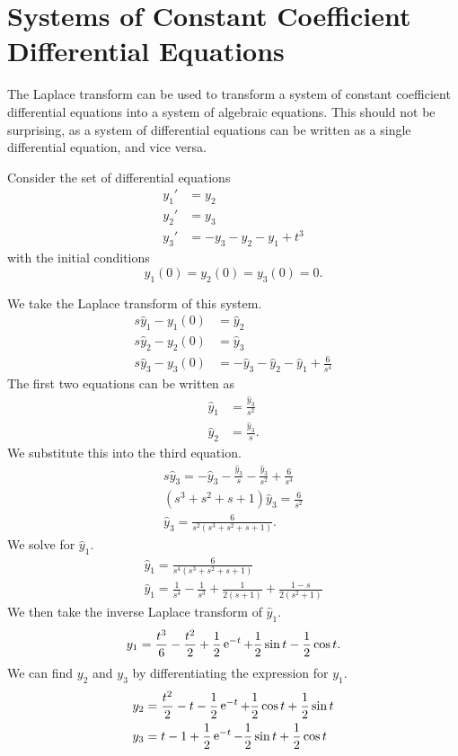 \section{Systems of Constant Coefficient Differential Equations}




The Laplace transform can be used to transform a system of 
constant coefficient differential equations into a system of 
algebraic equations.  This should not be surprising, as a system of
differential equations can be written as a single differential equation,
and vice versa.





\begin{Example}
  Consider the set of differential equations
  \begin{align*}
    y_1' &= y_2 \\
    y_2' &= y_3 \\
    y_3' &= -y_3 - y_2 - y_1 + t^3 
  \end{align*}
  with the initial conditions
  \[ 
  y_1(0) = y_2(0) = y_3(0) = 0.
  \]

  We take the Laplace transform of this system.
  \begin{align*}
    s \hat{y}_1 - y_1(0) &= \hat{y}_2 \\
    s \hat{y}_2 - y_2(0) &= \hat{y}_3 \\
    s \hat{y}_3 - y_3(0) &= -\hat{y}_3 - \hat{y}_2 - \hat{y}_1 + \frac{6}{s^4}
  \end{align*}
  The first two equations can be written as
  \begin{align*}
    \hat{y}_1 &= \frac{\hat{y}_3}{s^2} \\
    \hat{y}_2 &= \frac{\hat{y}_3}{s}.
  \end{align*}
  We substitute this into the third equation.
  \begin{gather*}
    s \hat{y}_3 = -\hat{y}_3 - \frac{\hat{y}_3}{s} - \frac{\hat{y}_3}{s^2} 
    + \frac{6}{s^4} \\
    (s^3 + s^2 + s + 1)\hat{y}_3 = \frac{6}{s^2} \\
    \hat{y}_3 = \frac{6}{s^2(s^3 + s^2 + s + 1)}.
  \end{gather*}
  We solve for $\hat{y}_1$.
  \begin{gather*}
    \hat{y}_1 = \frac{6}{s^4(s^3 + s^2 + s + 1)} \\
    \hat{y}_1 = \frac{1}{s^4} - \frac{1}{s^3} + \frac{1}{2(s+1)} + \frac{1-s}{2(s^2+1)}
  \end{gather*}
  We then take the inverse Laplace transform of $\hat{y}_1$.
  \[ 
  y_1 = \frac{t^3}{6} - \frac{t^2}{2} + \frac{1}{2} \mathop{\mathrm{e}}\nolimits^{-t} 
  + \frac{1}{2} \sin t - \frac{1}{2} \cos t.
  \]
  We can find $y_2$ and $y_3$ by differentiating the expression for $y_1$.
  \begin{align*}
    y_2 &= \frac{t^2}{2} - t - \frac{1}{2} \mathop{\mathrm{e}}\nolimits^{-t}
    + \frac{1}{2} \cos t + \frac{1}{2} \sin t \\
    y_3 &= t - 1 + \frac{1}{2} \mathop{\mathrm{e}}\nolimits^{-t} - \frac{1}{2} \sin t + \frac{1}{2}\cos t
  \end{align*}
\end{Example}
